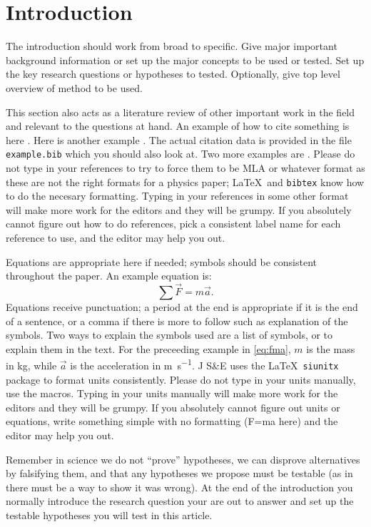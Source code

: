 \documentclass[amsmath,amssymb,aps,endfloats,linenumbers]{revtex4-2}
\begin{document}
\section{Introduction}
The introduction should work from broad to specific. Give major important background information or set up the major concepts to be used or tested. Set up the key research questions or hypotheses to tested. Optionally, give top level overview of method to be used. 

This section also acts as a literature review of other important work in the field and relevant to the questions at hand. An example of how to cite something is here \cite{tipler}. Here is another example \cite{openstax}. The actual citation data is provided in the file \texttt{example.bib} which you should also look at. Two more examples are \cite{rombauer:1931:joy, binzel:1988:hemispherical}. Please do not type in your references to try to force them to be MLA or whatever format as these are not the right formats for a physics paper; \LaTeX\ and \texttt{bibtex} know how to do the necesary formatting. Typing in your references in some other format will make more work for the editors and they will be grumpy. If you absolutely cannot figure out how to do references, pick a consistent label name for each reference to use, and the editor may help you out. 

Equations are appropriate here if needed; symbols should be consistent throughout the paper. An example equation is:
\begin{equation}
\sum \vec{F} = m \vec{a}.
\label{eq:fma} %
\end{equation}
Equations receive punctuation; a period at the end is appropriate if it is the end of a sentence, or a comma if there is more to follow such as explanation of the symbols. Two ways to explain the symbols used are a list of symbols, or to explain them in the text. For the preceeding example in \cref{eq:fma}, $m$ is the mass in \unit{\kilo\gram}, while $\vec{a}$ is the acceleration in \unit{\meter\per\second}. J S\&E uses the \LaTeX\ \texttt{siunitx} package to format units consistently. Please do not type in your units manually, use the macros. Typing in your units manually will make more work for the editors and they will be grumpy. If you absolutely cannot figure out units or equations, write something simple with no formatting (F=ma here) and the editor may help you out. 

Remember in science we do not ``prove'' hypotheses, we can disprove alternatives by falsifying them, and that any hypotheses we propose must be testable (as in there must be a way to show it was wrong). At the end of the introduction you normally introduce the research question your are out to answer and set up the testable hypotheses you will test in this article. 
\end{document}
